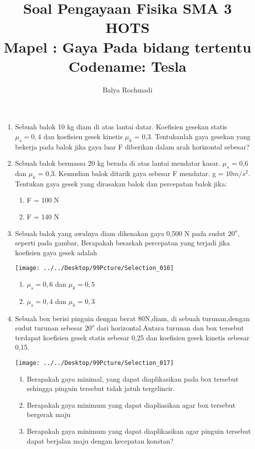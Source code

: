 \documentclass[12pt,a4paper,draft,final,oneside,twoside,openright,openany]{article}
\author{Balya Rochmadi}
\title{Soal Pengayaan Fisika SMA 3 HOTS\\ Mapel : Gaya Pada bidang tertentu\\Codename: Tesla}
\begin{document}
	\maketitle
	\Large
	\begin{enumerate}
		
		\item Sebuah balok 10 kg diam di atas lantai datar. Koefisien gesekan statis $\mu_s = 0,4$ dan koefisien gesek kinetis $\mu_k$ = 0,3. Tentukanlah gaya gesekan yang bekerja pada balok jika gaya luar F diberikan dalam arah horizontal sebesar?
		\item  Sebuah balok bermassa 20 kg berada di atas lantai mendatar kasar. $\mu_s$ = 0,6 dan $\mu_k$ = 0,3. Kemudian balok ditarik gaya sebesar F mendatar. g = $10 m/s^2$. Tentukan gaya gesek yang dirasakan balok dan percepatan balok jika:
		\begin{enumerate}
			\item F = 100 N
			\item F = 140 N
		\end{enumerate}
		\item Sebuah balok yang awalnya diam dikenakan gaya 0,500 N pada sudut $20^o$, seperti pada gambar, Berapakah besarkah percepatan yang terjadi jika koefisien gaya gesek adalah
		\begin{center}
			\texttt{[image: ../../Desktop/99Pcture/Selection\_016]}
		\end{center}
		\begin{enumerate}
			\item $\mu_s=0,6$ dan $\mu_k=0,5$
			\item $\mu_s=0,4$ dan $\mu_k=0,3$ 
		\end{enumerate}
		\item Sebuah box berisi pinguin dengan berat 80N,diam, di sebuah turunan,dengan sudut turunan sebesar $20^o$ dari horizontal.Antara turunan dan box tersebut terdapat koefisien gesek statis sebesar 0,25 dan koefisien gesek kinetis sebesar 0,15. 
		\begin{center}
				\texttt{[image: ../../Desktop/99Pcture/Selection\_017]}
		\end{center}
				
		 \begin{enumerate}
		 	\item  Berapakah gaya minimal, yang dapat diaplikasikan pada box tersebut sehingga pinguin tersebut tidak jatuh tergelincir.
		 	\item  Berapakah gaya minimum yang dapat diapliasikan agar box tersebut bergerak maju
		 	\item Berapakah gaya minimum yang dapat diaplikasikan agar pinguin tersebut dapat berjalan maju dengan kecepatan konstan?
		 \end{enumerate}
		 

\end{enumerate}
\end{document}
